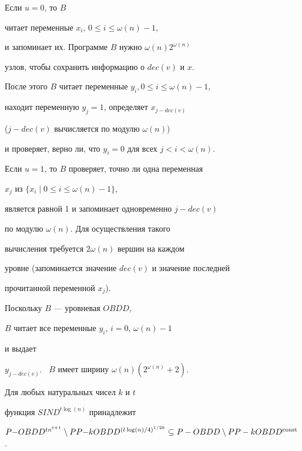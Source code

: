 \begin{pf}
Если $u=0$, то $B$


читает переменные $x_i$, $0\le i\le\omega(n)-1$,


и запоминает их. Программе $B$ нужно $\omega(n)2^{\omega(n)}$


узлов, чтобы сохранить информацию о $dec(v)$ и $x$.


После этого $B$ читает переменные $y_i, 0\le i\le \omega(n)-1$,


находит переменную $y_j=1$, определяет $x_{j-dec(v)}$


($j-dec(v)$ вычисляется по модулю $\omega(n)$)


и проверяет, верно ли, что $y_i=0$ для всех $j<i<\omega(n)$.





Если $u=1$, то $B$ проверяет, точно ли одна переменная


$x_j$ из $\{x_i\mid 0\leq i\leq \omega(n)-1\}$,


является равной 1 и запоминает одновременно $j-dec(v)$


по модулю $\omega(n)$. Для осуществления такого


вычисления требуется $2\omega(n)$ вершин на каждом


уровне (запоминается значение $dec(v)$ и значение последней


прочитанной переменной $x_j$).


Поскольку $B$ --- уровневая $OBDD$,


$B$ читает все переменные $y_i$, $i=0$, $\omega(n)-1$


и выдает


$y_{j-dec(v)}$. \ $B$ имеет ширину $\omega(n)(2^{\omega(n)}+2)$.


\end{pf}








\begin{cor}


Для любых натуральных чисел $k$ и $t$


функция $SIND^{t\log(n)}$ принадлежит


$P{-}OBDD^{tn^{t+1}}\setminus PP{-}kOBDD^{(t\log(n)/4)^{1/2k}}


\subseteq P-OBDD\setminus PP-kOBDD^{\const}$.


\end{cor}








